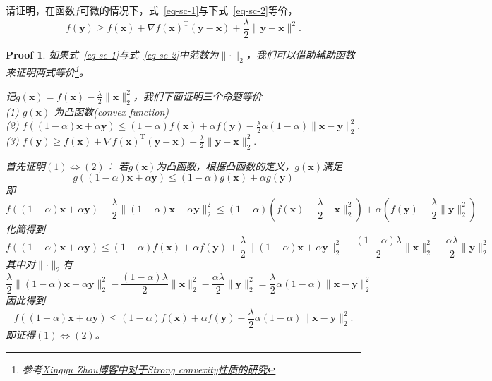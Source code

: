 \documentclass[a4paper,UTF8]{article}
\numberwithin{equation}{section}
\newtheorem*{myProof}{Proof}
\begin{document}
请证明，在函数$f$可微的情况下，式~\eqref{eq-sc-1}与下式~\eqref{eq-sc-2}等价，
\begin{equation}
  \label{eq-sc-2}
  f(\mathbf{y}) \geq f(\mathbf{x}) + \nabla f(\mathbf{x})^\mathrm{T}(\mathbf{y}-\mathbf{x}) + \frac{\lambda}{2}\lVert \mathbf{y} - \mathbf{x}\rVert^2.
\end{equation}

\begin{myProof}

如果式~\eqref{eq-sc-1}与式~\eqref{eq-sc-2}中范数为$\lVert \cdot \rVert_2$，我们可以借助辅助函数来证明两式等价\footnote{参考\href{http://xingyuzhou.org/blog/notes/strong-convexity}{Xingyu Zhou博客中对于Strong convexity性质的研究}}。

记$g(\mathbf{x}) = f(\mathbf{x}) - \frac{\lambda}{2} \rVert \mathbf{x} \rVert ^2_2$，我们下面证明三个命题等价\\
(1) $g(\mathbf{x})$ 为凸函数(convex function) \\
(2) $ f((1-\alpha)\mathbf{x} + \alpha\mathbf{y})\leq (1-\alpha)f(\mathbf{x}) + \alpha f(\mathbf{y}) - \frac{\lambda}{2}\alpha(1-\alpha)\lVert \mathbf{x} - \mathbf{y}\rVert^2_2.$ \\
(3)  $f(\mathbf{y}) \geq f(\mathbf{x}) + \nabla f(\mathbf{x})^\mathrm{T}(\mathbf{y}-\mathbf{x}) + \frac{\lambda}{2}\lVert \mathbf{y} - \mathbf{x}\rVert^2_2.$


首先证明$(1) \Leftrightarrow (2)$：
若$g(\mathbf{x})$为凸函数，根据凸函数的定义，$g(\mathbf{x})$满足
\[ g((1-\alpha)\mathbf{x}+\alpha\mathbf{y}) \leq (1-\alpha)g(\mathbf{x}) + \alpha g(\mathbf{y}) \]
即
\[ f((1-\alpha)\mathbf{x}+\alpha\mathbf{y}) - \frac{\lambda}{2}  \rVert (1-\alpha)\mathbf{x}+\alpha\mathbf{y} \rVert ^2_2 \leq (1-\alpha)(f(\mathbf{x}) - \frac{\lambda}{2} \rVert \mathbf{x} \rVert ^2_2) + \alpha(f(\mathbf{y}) - \frac{\lambda}{2} \lVert \mathbf{y} \rVert ^2_2) \]
化简得到
\[ f((1-\alpha)\mathbf{x}+\alpha\mathbf{y}) \leq (1-\alpha)f(\mathbf{x}) + \alpha f(\mathbf{y}) +\frac{\lambda}{2}  \lVert (1-\alpha)\mathbf{x}+\alpha\mathbf{y} \rVert ^2_2- \frac{(1-\alpha) \lambda}{2} \rVert \mathbf{x} \rVert ^2_2 -\frac{\alpha \lambda}{2} \lVert \mathbf{y} \rVert ^2_2 \]
其中对$\lVert \cdot \rVert_2$有
\[ \frac{\lambda}{2}  \lVert (1-\alpha)\mathbf{x}+\alpha\mathbf{y} \rVert ^2_2 - \frac{(1-\alpha) \lambda}{2} \lVert \mathbf{x} \rVert ^2_2 -\frac{\alpha \lambda}{2} \lVert \mathbf{y} \rVert ^2_2 = \frac{\lambda}{2}\alpha(1-\alpha)\lVert \mathbf{x} - \mathbf{y}\rVert^2_2 \]
因此得到
\[ f((1-\alpha)\mathbf{x} + \alpha\mathbf{y})\leq (1-\alpha)f(\mathbf{x}) + \alpha f(\mathbf{y}) - \frac{\lambda}{2}\alpha(1-\alpha)\lVert \mathbf{x} - \mathbf{y}\rVert^2_2. \]
即证得$(1) \Leftrightarrow (2)$。


\end{myProof}
\end{document}

